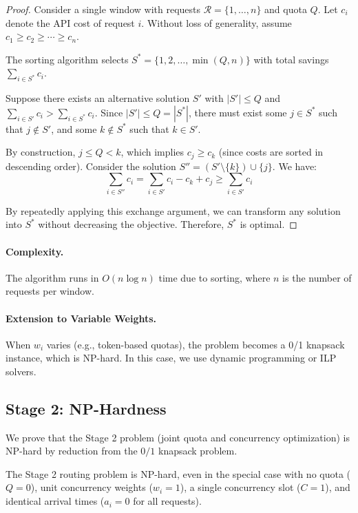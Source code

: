 \begin{proof}
Consider a single window with requests $\mathcal{R} = \{1, \ldots, n\}$ and quota $Q$. Let $c_i$ denote the API cost of request $i$. Without loss of generality, assume $c_1 \geq c_2 \geq \cdots \geq c_n$.

The sorting algorithm selects $S^* = \{1, 2, \ldots, \min(Q, n)\}$ with total savings $\sum_{i \in S^*} c_i$.

Suppose there exists an alternative solution $S'$ with $|S'| \leq Q$ and $\sum_{i \in S'} c_i > \sum_{i \in S^*} c_i$. Since $|S'| \leq Q = |S^*|$, there must exist some $j \in S^*$ such that $j \notin S'$, and some $k \notin S^*$ such that $k \in S'$.

By construction, $j \leq Q < k$, which implies $c_j \geq c_k$ (since costs are sorted in descending order). Consider the solution $S'' = (S' \setminus \{k\}) \cup \{j\}$. We have:
\[
\sum_{i \in S''} c_i = \sum_{i \in S'} c_i - c_k + c_j \geq \sum_{i \in S'} c_i
\]

By repeatedly applying this exchange argument, we can transform any solution into $S^*$ without decreasing the objective. Therefore, $S^*$ is optimal.
\end{proof}

\paragraph{Complexity.} The algorithm runs in $O(n \log n)$ time due to sorting, where $n$ is the number of requests per window.

\paragraph{Extension to Variable Weights.} When $w_i$ varies (e.g., token-based quotas), the problem becomes a 0/1 knapsack instance, which is NP-hard. In this case, we use dynamic programming or ILP solvers.

\subsection{Stage 2: NP-Hardness}
\label{app:stage2_hardness}

We prove that the Stage 2 problem (joint quota and concurrency optimization) is NP-hard by
reduction from the $0/1$ knapsack problem.

\begin{theorem}
The Stage 2 routing problem is NP-hard, even in the special case with no quota ($Q=0$),
unit concurrency weights ($w_i=1$), a single concurrency slot ($C=1$), and identical arrival
times ($a_i=0$ for all requests).
\end{theorem}

